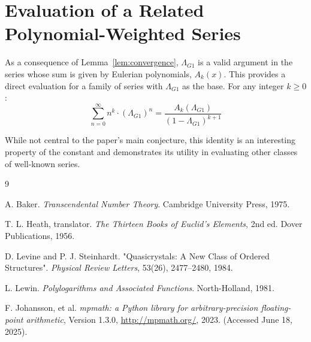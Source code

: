 \documentclass{amsart}
\theoremstyle{plain}
\theoremstyle{definition}
\theoremstyle{remark}
\newcommand{\LambdaG}{\Lambda_{G1}}
\begin{document}
\section{Evaluation of a Related Polynomial-Weighted Series}
As a consequence of Lemma~\ref{lem:convergence}, $\LambdaG$ is a valid argument in the series whose sum is given by Eulerian polynomials, $A_k(x)$. This provides a direct evaluation for a family of series with $\LambdaG$ as the base. For any integer $k \ge 0$:
\[ \sum_{n=0}^{\infty} n^k \cdot (\LambdaG)^n = \frac{A_k(\LambdaG)}{(1-\LambdaG)^{k+1}} \]

While not central to the paper's main conjecture, this identity is an interesting property of the constant and demonstrates its utility in evaluating other classes of well-known series.

\begin{thebibliography}{9}

A. Baker. \textit{Transcendental Number Theory}. Cambridge University Press, 1975. 

T. L. Heath, translator. \textit{The Thirteen Books of Euclid's Elements}, 2nd ed. Dover Publications, 1956. 

D. Levine and P. J. Steinhardt. "Quasicrystals: A New Class of Ordered Structures". \textit{Physical Review Letters}, 53(26), 2477--2480, 1984.

L. Lewin. \textit{Polylogarithms and Associated Functions}. North-Holland, 1981. 

F. Johansson, et al. \textit{mpmath: a Python library for arbitrary-precision floating-point arithmetic}, Version 1.3.0, \url{http://mpmath.org/}, 2023. (Accessed June 18, 2025).

\end{thebibliography}
\end{document}
